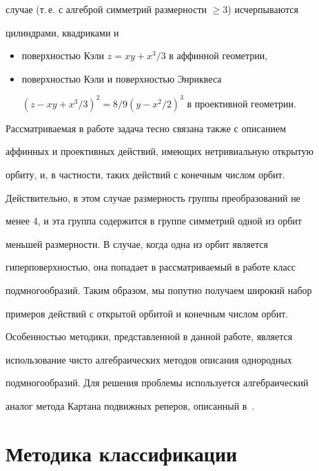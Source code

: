 случае (т.\,е. с алгеброй симметрий размерности $\ge3$) исчерпываются


цилиндрами, квадриками и 


\begin{itemize}


\item[] поверхностью Кэли $z=xy+x^3/3$ в аффинной геометрии,


\item[] поверхностью Кэли и поверхностью Энриквеса %


$(z-xy+x^3/3)^2=8/9(y-x^2/2)^3$ в проективной геометрии.


\end{itemize}





Рассматриваемая в работе задача тесно связана также с описанием


аффинных и проективных действий, имеющих нетривиальную открытую


орбиту, и, в частности, таких действий с конечным числом орбит.


Действительно, в этом случае размерность группы преобразований не


менее 4, и эта группа содержится в группе симметрий одной из орбит


меньшей размерности. В случае, когда одна из орбит является


гиперповерхностью, она попадает в рассматриваемый в работе класс


подмногообразий. Таким образом, мы попутно получаем широкий набор


примеров действий с открытой орбитой и конечным числом орбит.





Особенностью методики, представленной в данной работе, является


использование чисто алгебраических методов описания однородных


подмногообразий. Для решения проблемы используется алгебраический


аналог метода Картана подвижных реперов, описанный в~\cite{nr:nk}.





\section{Методика классификации}





